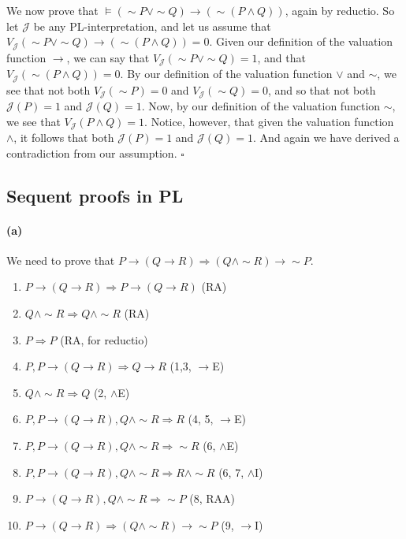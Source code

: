 \documentclass[sloppy, journal, git, bytitle]{humapap}
\begin{document}
We now prove that $\vDash (\sim P\vee\sim Q)\rightarrow(\sim(P\wedge Q))$, again by reductio. 
So let $\mathcal{J}$ be any PL-interpretation, and let us assume that 
$V\mathcal{_J}(\sim P\vee\sim Q)\rightarrow(\sim(P\wedge Q))=0$. 
Given our definition of the valuation function $\rightarrow$, we can say that 
$V\mathcal{_J}(\sim P\vee\sim Q)=1$, and that
$V\mathcal{_J}(\sim(P\wedge Q))=0$. 
By our definition of the valuation function $\vee$ and $\sim$, we see that not both 
$V\mathcal{_J}(\sim P)=0$ and 
$V\mathcal{_J}(\sim Q)=0$, and so that not both 
$\mathcal{J}(P)=1$ and 
$\mathcal{J}(Q)=1$. 
Now, by our definition of the valuation function $\sim$, we see that 
$V\mathcal{_J}(P\wedge Q)=1$.
Notice, however, that given the valuation function $\wedge$, 
it follows that both 
$\mathcal{J}(P)=1$ and 
$\mathcal{J}(Q)=1$.
And again we have derived a contradiction from our assumption. $\square$ 

\subsection{Sequent proofs in PL}

\paragraph{(a)} We need to prove that $P\rightarrow (Q\rightarrow R)\Rightarrow (Q\wedge\sim R)\rightarrow\sim P$. 
\begin{enumerate}
	\item $P\rightarrow (Q\rightarrow R)\Rightarrow P\rightarrow (Q\rightarrow R)$ \hfil (RA)
	\item $Q\wedge\sim R\Rightarrow Q\wedge\sim R$ \hfil (RA)
	\item $P\Rightarrow P$ \hfil (RA, for reductio)
	\item $P, P\rightarrow (Q\rightarrow R)\Rightarrow Q\rightarrow R$ \hfil (1,3, $\rightarrow$E)
	\item $Q\wedge\sim R\Rightarrow Q$ \hfil (2, $\wedge$E)
	\item $P, P\rightarrow (Q\rightarrow R), Q\wedge\sim R\Rightarrow R$ \hfil (4, 5, $\rightarrow$E)
	\item $P, P\rightarrow (Q\rightarrow R), Q\wedge\sim R\Rightarrow \sim R$ \hfil (6, $\wedge$E)
	\item $P, P\rightarrow (Q\rightarrow R), Q\wedge\sim R\Rightarrow R\wedge\sim R$ \hfil (6, 7, $\wedge$I)
	\item $P\rightarrow (Q\rightarrow R), Q\wedge\sim R\Rightarrow\sim P$ \hfil (8, RAA)
	\item $P\rightarrow (Q\rightarrow R)\Rightarrow(Q\wedge\sim R)\rightarrow\sim P$ \hfil (9, $\rightarrow$I)
\end{enumerate}
\end{document}
